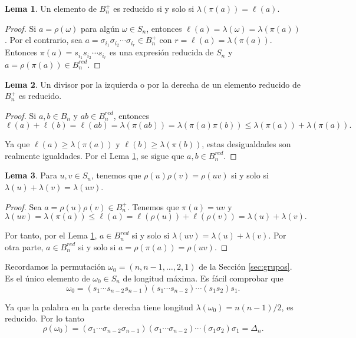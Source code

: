 \documentclass[12pt]{book}
\theoremstyle{definition}
\newtheorem{lema}{Lema}[section]
\begin{document}
\begin{lema}
Un elemento de $B_n^+$ es reducido si y solo si $\lambda(\pi(a))=\ell(a)$.
\label{lema:reduced1}
\end{lema}

\begin{proof} Si $a=\rho(\omega)$ para algún $\omega\in S_n$, entonces $\ell(a)=\lambda(\omega)=\lambda(\pi(a))$. Por el contrario, sea $a=\sigma_{i_1}\sigma_{i_2}\cdots \sigma_{i_r}\in B_n^+$ con $r=\ell(a)=\lambda(\pi(a))$. Entonces $\pi(a)=s_{i_1}s_{i_2}\cdots s_{i_r}$ es una expresión reducida de $S_n$ y $a=\rho(\pi(a))\in B_n^{red}$.
\end{proof}

\begin{lema}
Un divisor por la izquierda o por la derecha de un elemento reducido de $B_n^+$ es reducido.
\label{lema:reduced2}
\end{lema}

\begin{proof} Si $a,b\in B_n$ y $ab\in B_n^{red}$, entonces
$$\ell(a) + \ell(b)= \ell(ab)=\lambda(\pi(ab))=\lambda(\pi(a)\pi(b))\leq \lambda(\pi(a))+\lambda(\pi(a)).$$

Ya que $\ell(a)\geq \lambda(\pi(a))$ y $\ell(b)\geq \lambda(\pi(b))$, estas desigualdades son realmente igualdades. Por el Lema \ref{lema:reduced1}, se sigue que $a,b\in B_n^{red}$.\end{proof}

\begin{lema}
Para $u,v\in S_n$, tenemos que $\rho(u)\rho(v)=\rho(uv)$ si y solo si $\lambda(u)+\lambda(v)=\lambda(uv)$.
\label{lema:longi}
\end{lema}

\begin{proof} Sea $a=\rho(u)\rho(v)\in B_n^+$. Tenemos que $\pi(a)= uv$ y 
$$\lambda(uv)=\lambda(\pi(a))\leq\ell(a)=\ell(\rho(u))+\ell(\rho(v))=\lambda(u)+\lambda(v).$$

Por tanto, por el Lema \ref{lema:reduced1}, $a\in B_n^{red}$ si y solo si $\lambda(uv)=\lambda(u)+\lambda(v)$. Por otra parte, $a\in B_n^{red}$ si y solo si $a=\rho(\pi(a))=\rho(uv)$.
\end{proof}


Recordamos la permutación $\omega_0=(n,n-1,\ldots,2,1)$ de la Sección \ref{sec:grupos}. Es el único elemento de $\omega_0\in S_n$ de longitud máxima. Es fácil comprobar que
$$\omega_0=(s_1\cdots s_{n-2}s_{n-1})(s_1\cdots s_{n-2})\cdots(s_1s_2)s_1.$$

Ya que la palabra en la parte derecha tiene longitud $\lambda(\omega_0)=n(n-1)/2$, es reducido. Por lo tanto
$$\rho(\omega_0)=(\sigma_1\cdots \sigma_{n-2}\sigma_{n-1})(\sigma_1\cdots \sigma_{n-2})\cdots(\sigma_1\sigma_2)\sigma_1=\Delta_n.$$
\end{document}
